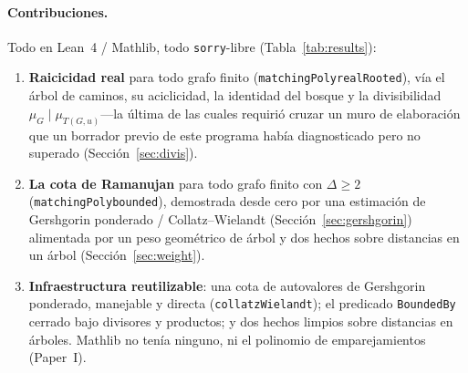 \documentclass[11pt]{article}
\newcommand{\lean}[1]{{\def\_{\textunderscore\allowbreak}\texttt{#1}}}
\begin{document}
\paragraph{Contribuciones.} Todo en Lean~4 / Mathlib, todo \lean{sorry}-libre
(Tabla~\ref{tab:results}):
\begin{enumerate}\itemsep2pt
\item \textbf{Raicicidad real} para todo grafo finito
  (\lean{matchingPoly\_realRooted}), v\'ia el \'arbol de caminos, su aciclicidad, la
  identidad del bosque y la divisibilidad $\mu_G\mid\mu_{T(G,u)}$---la \'ultima de
  las cuales requiri\'o cruzar un muro de elaboraci\'on que un borrador previo de
  este programa hab\'ia diagnosticado pero no superado (Secci\'on~\ref{sec:divis}).
\item \textbf{La cota de Ramanujan} para todo grafo finito con $\Delta\ge2$
  (\lean{matchingPoly\_bounded}), demostrada desde cero por una estimaci\'on de
  Gershgorin ponderado / Collatz--Wielandt (Secci\'on~\ref{sec:gershgorin})
  alimentada por un peso geom\'etrico de \'arbol y dos hechos sobre distancias en un
  \'arbol (Secci\'on~\ref{sec:weight}).
\item \textbf{Infraestructura reutilizable}: una cota de autovalores de Gershgorin
  ponderado, manejable y directa (\lean{collatzWielandt}); el predicado
  \lean{BoundedBy} cerrado bajo divisores y productos; y dos hechos limpios sobre
  distancias en \'arboles. Mathlib no ten\'ia ninguno, ni el polinomio de
  emparejamientos (Paper~I).
\end{enumerate}
\end{document}
